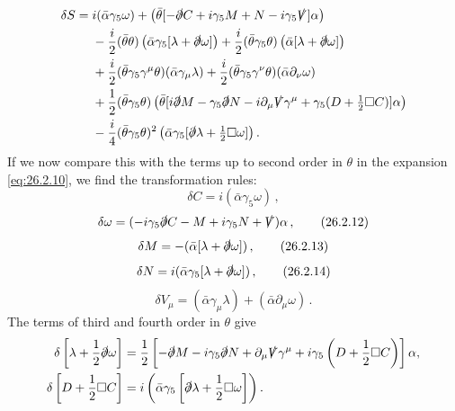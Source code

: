 \[
  \begin{aligned}
  \delta S={}&i(\bar\alpha\gamma_5\omega)
  +\left(\bar\theta
    [-\sl{\partial}C+i\gamma_5M+N-i\gamma_5\sl{V}]\alpha\right)\\
  &-\frac{i}{2}(\bar\theta\theta)
    \left(\bar\alpha\gamma_5[\lambda+\sl{\partial}\omega]\right)
  +\frac{i}{2}(\bar\theta\gamma_5\theta)
    \left(\bar\alpha[\lambda+\sl{\partial}\omega]\right)\\
  &+\frac{i}{2}(\bar\theta\gamma_5\gamma^\mu\theta)
    (\bar\alpha\gamma_\mu\lambda)
  +\frac{i}{2}(\bar\theta\gamma_5\gamma^\nu\theta)
    (\bar\alpha\partial_\nu\omega)\\
  &+\frac12(\bar\theta\gamma_5\theta)
    \left(\bar\theta
      [i\sl{\partial}M-\gamma_5\sl{\partial}N
       -i\partial_\mu\sl{V}\gamma^\mu
       +\gamma_5(D+\tfrac12\Box C)]\alpha\right)\\
  &-\frac{i}{4}(\bar\theta\gamma_5\theta)^2
    \left(\bar\alpha\gamma_5
      [\sl{\partial}\lambda+\tfrac12\Box\omega]\right).
  \end{aligned}
\]
If we now compare this with the terms up to second order in $\theta$ in the
expansion \eqref{eq:26.2.10}, we find the transformation rules:
\begin{equation}
  \delta C=i(\bar\alpha\gamma_5\omega)\,,
  \tag{26.2.11}\label{eq:26.2.11}
\end{equation}
\begin{equation}
  \delta\omega
  =(-i\gamma_5\sl{\partial}C-M+i\gamma_5N+\sl{V})\alpha\,,
  \tag{26.2.12}\label{eq:26.2.12}
\end{equation}
\begin{equation}
  \delta M=-(\bar\alpha[\lambda+\sl{\partial}\omega])\,,
  \tag{26.2.13}\label{eq:26.2.13}
\end{equation}
\begin{equation}
  \delta N=i(\bar\alpha\gamma_5[\lambda+\sl{\partial}\omega])\,,
  \tag{26.2.14}\label{eq:26.2.14}
\end{equation}
\begin{equation}
  \delta V_\mu=(\bar\alpha\gamma_\mu\lambda)
  +(\bar\alpha\partial_\mu\omega)\,.
  \tag{26.2.15}\label{eq:26.2.15}
\end{equation}
The terms of third and fourth order in $\theta$ give
\[
  \begin{aligned}
  \delta\left[\lambda+\frac12\sl{\partial}\omega\right]
  &=\frac12\left[
    -\sl{\partial}M-i\gamma_5\sl{\partial}N
    +\partial_\mu\sl{V}\gamma^\mu
    +i\gamma_5\left(D+\frac12\Box C\right)\right]\alpha,\\
  \delta\left[D+\frac12\Box C\right]
  &=i\left(\bar\alpha\gamma_5
    \left[\sl{\partial}\lambda+\frac12\Box\omega\right]\right).
  \end{aligned}
\]
